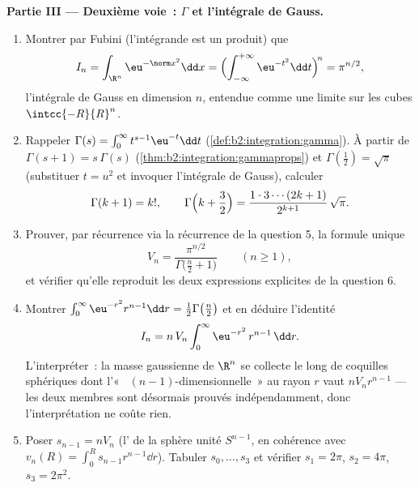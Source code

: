 \begin{problem}[{Problème du week-end --- $V_n =
\pi^{n/2}/\Gamma(\frac n2 + 1)$, et l'étrangeté des grandes
dimensions}]
\medskip
\noindent\textbf{Partie III --- Deuxième voie~: $\Gamma$ et
l'intégrale de Gauss.}
\begin{enumerate}[resume]
  \item Montrer par Fubini (l'intégrande est un produit) que
        \[
        I_n = \int_{\R^n}\eu^{-\norm
        x^2}\dd x
        = \Bigl(\int_{-\infty}^{+\infty}
        \eu^{-t^2}\dd t\Bigr)^{\!n} = \pi^{n/2},
        \]
        l'intégrale de Gauss en dimension $n$, entendue comme une
        limite sur les cubes $\intcc{-R}{R}^n$.
  \item Rappeler $\Gamma(s) = \int_0^\infty t^{s-1}\eu^{-t}\dd
        t$ (\cref{def:b2:integration:gamma}). À partir de
        $\Gamma(s+1) = s\,\Gamma(s)$
        (\cref{thm:b2:integration:gammaprops}) et
        $\Gamma(\tfrac12) = \sqrt\pi$ (substituer $t = u^2$
        et invoquer l'intégrale de Gauss), calculer
        \[
        \Gamma(k + 1) = k!,
        \qquad
        \Gamma\Bigl(k + \frac32\Bigr) =
        \frac{1\cdot3\cdots(2k+1)}{2^{k+1}}\,\sqrt\pi .
        \]
  \item Prouver, par récurrence via la récurrence de la question
        5, la formule unique
        \[
        V_n = \frac{\pi^{n/2}}{\Gamma\bigl(\frac n2 +
        1\bigr)} \qquad (n \geq 1),
        \]
        et vérifier qu'elle reproduit les deux expressions explicites
        de la question 6.
  \item Montrer $\int_0^\infty \eu^{-r^2}r^{n-1}\dd r =
        \tfrac12\Gamma\bigl(\tfrac n2\bigr)$ et en déduire
        l'identité
        \[
        I_n = n\,V_n\int_0^\infty \eu^{-r^2}\,r^{n-1}\,\dd r.
        \]
        L'interpréter~: la masse gaussienne de $\R^n$ se
        collecte le long de coquilles sphériques dont
        l'«~ $(n-1)$-dimensionnelle~» au rayon $r$ vaut
        $nV_nr^{n-1}$ --- les deux membres sont désormais prouvés
        indépendamment, donc l'interprétation ne coûte rien.
  \item Poser $s_{n-1} = nV_n$ (l' de la sphère unité
        $S^{n-1}$, en cohérence avec $v_n(R) = \int_0^R
        s_{n-1}r^{n-1}\dd r$). Tabuler $s_0, \dots, s_3$ et
        vérifier $s_1 = 2\pi$, $s_2 = 4\pi$, $s_3 = 2\pi^2$.
\end{enumerate}


\end{problem}
